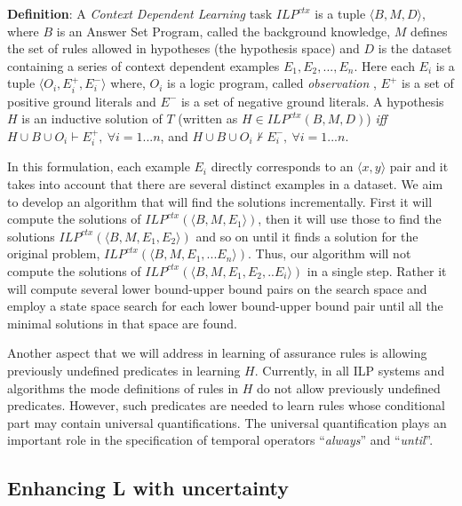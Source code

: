 {\bf Definition}:	A \textit{Context Dependent Learning} task $ILP^{ctx}$ is a tuple $\langle B,M,D \rangle$, where $B$ is an Answer Set Program, called the background knowledge, $M$ defines the set of rules allowed in hypotheses (the hypothesis space) and $D$ is the dataset containing a series of context dependent examples $E_1,E_2,..., E_n$. Here each $E_i$ is a tuple $\langle O_i,E_{i}^{+}, E_{i}^{-} \rangle$ where,  $O_i$ is a logic program, called \textit{observation} , $E^{+}$ is a set of positive ground literals and $E^{-}$ is a set of negative ground literals. A hypothesis $H$ is an inductive solution of $T$ (written as $H \in ILP^{ctx}(B,M,D)$) \textit{iff}
	$H\cup B \cup O_i \vdash E_{i}^{+}, ~\forall i=1...n$,  and   
	$H\cup B \cup O_i \not \vdash E_{i}^{-}, ~\forall i=1...n$. 

In this formulation, each example $E_i$ directly corresponds to an $\langle x,y \rangle$ pair and it takes into account that there are several distinct examples in a dataset. 
We aim to develop an algorithm that will find the solutions incrementally. First it will compute the solutions of $ILP^{ctx}(\langle B,M,{E_1}\rangle)$, then it will use those to find the solutions $ILP^{ctx}(\langle B,M,{E_1, E_2} \rangle)$ and so on until it finds a solution for the original problem, $ILP^{ctx}(\langle B,M,{E_1,...E_n}\rangle)$. Thus, our algorithm will not compute the solutions of $ILP^{ctx}(\langle B,M,{E_1, E_2,..E_i}\rangle)$ in a single step. Rather it will compute several lower bound-upper bound pairs on the search space and employ a state space search for each lower bound-upper bound pair until all the minimal solutions in that space are found. 

Another aspect that we will address in learning of assurance rules is allowing previously undefined predicates in learning $H$. Currently, in all ILP systems and algorithms the mode definitions of rules in $H$ do not allow previously undefined predicates. However, such predicates are needed to learn rules whose conditional part may contain universal quantifications. The universal quantification plays an important role in the specification of temporal operators ``{\em always}'' and ``{\em until}''.

\subsection{Enhancing L with uncertainty}

